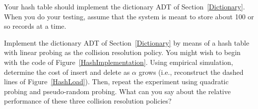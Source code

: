 \begin{projects}
Your hash table should implement the dictionary ADT of
Section~\ref{Dictionary}.
When you do your testing, assume that the system is meant to store
about 100 or so records at a time.

\item
Implement the dictionary ADT of
Section~\ref{Dictionary} by means of a
hash table with linear probing as the collision resolution
policy.
You might wish to begin with the code of Figure~\ref{HashImplementation}.
Using empirical simulation, determine the cost of insert and delete as
\(\alpha\) grows (i.e., reconstruct the dashed lines of
Figure~\ref{HashLoad}).
Then, repeat the experiment using quadratic probing and pseudo-random
probing.
What can you say about the relative performance of these three
collision resolution policies?


\end{projects}
